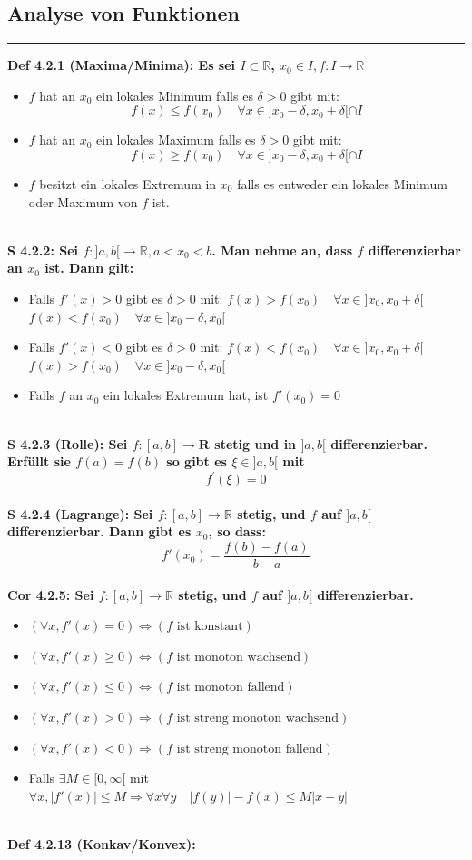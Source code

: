 \documentclass[7pt,landscape, margin = 0.1mm]{article}
\newcommand*{\mysubsection}[1]{\vspace{-2mm}\color{chaptercolor}\subsection{ #1 }
\vspace{-1mm}\hrule\vspace{1.5mm}\color{black}
\vspace{2mm}}
\newcommand{\DEF}[2]{\color{chaptercolor}\bf{Def #1}:\color{black}    \hspace{0.2cm} #2 \\}
\newcommand{\COR}[2]{\color{chaptercolor}\bf{Cor #1}:\color{black}    \hspace{0.2cm} #2 \\}
\newcommand{\SA}[2]{\color{chaptercolor}\bf{S #1}:\color{black}    \hspace{0.2cm} #2 \\}
\begin{document}
\begin{multicols}{4}
\begin{flushleft}
\mysubsection{Analyse von Funktionen}
\DEF{4.2.1 (Maxima/Minima)}{Es sei $I \subset \mathbb{R}$, $x_0 \in I, f:I \longrightarrow \mathbb{R}$
\begin{itemize}


\item[1.] $f$ hat an $x_0$ ein lokales Minimum falls es $\delta >0$ gibt mit:
$$ f(x) \leq f(x_0) \quad \forall x \in ]x_0-\delta,x_0+\delta[\cap I $$
\item[2.] $f$ hat an $x_0$ ein lokales Maximum falls es $\delta >0$ gibt mit:$$ f(x) \geq f(x_0) \quad \forall x \in ]x_0-\delta,x_0+\delta[\cap I $$
\item[3.] $f$ besitzt ein lokales Extremum in $x_0$ falls es entweder ein lokales Minimum oder Maximum von $f$ ist.
\end{itemize}}
\SA{4.2.2}{Sei $f: ]a,b[ \longrightarrow \mathbb{R},a<x_0<b$. Man nehme an, dass $f$ differenzierbar an $x_0$ ist. Dann gilt:
\begin{itemize}
\item[1.] Falls $f'(x)>0$ gibt es $\delta > 0$ mit:
   $f(x)> f(x_0) \quad \forall x \in ]x_0,x_0+\delta[$
$f(x)< f(x_0) \quad \forall x \in ]x_0 - \delta,x_0[$
\item[2.] Falls $f'(x)<0$ gibt es $\delta > 0$ mit:
 $f(x)< f(x_0) \quad \forall x \in ]x_0,x_0+\delta[$
$f(x)> f(x_0) \quad \forall x \in ]x_0 - \delta,x_0[$
\item[3.] Falls $f$ an $x_0$ ein lokales Extremum hat, ist $f'(x_0)=0$
\end{itemize}}
\SA{4.2.3 (Rolle)}{Sei $f:[a, b] \longrightarrow \mathbf{R}$ stetig und in $] a, b[$ differenzierbar. Erfüllt sie $f(a)=f(b)$ so gibt es $\xi \in] a, b[$ mit
$$ f^{\prime}(\xi)=0 $$}
\SA{4.2.4 (Lagrange)}{Sei $f:[a,b] \longrightarrow \mathbb{R}$ stetig, und $f$ auf $]a,b[$ differenzierbar. Dann gibt es $x_0$, so dass:
$$ f'(x_0)= \frac{f(b)-f(a)}{b-a} $$}
\COR{4.2.5}{Sei $f:[a,b] \longrightarrow \mathbb{R}$ stetig, und $f$ auf $]a,b[$ differenzierbar.
\begin{itemize}
\item[1.] $\left( \forall x , f'(x) = 0 \right) \Leftrightarrow \left( f \text{ ist konstant} \right)$
\item[2.] $\left( \forall x , f'(x) \geq 0 \right) \Leftrightarrow \left( f \text{ ist monoton wachsend} \right)$
\item[3.] $\left( \forall x , f'(x) \leq 0 \right) \Leftrightarrow \left( f \text{ ist monoton fallend} \right)$
\item[4.] $\left( \forall x , f'(x) > 0 \right) \Rightarrow \left( f \text{ ist streng monoton wachsend} \right)$
\item[5.] $\left( \forall x , f'(x) < 0 \right) \Rightarrow \left( f \text{ ist streng monoton fallend} \right)$
\item[6.] Falls $\exists M \in [0,\infty[$ mit $\forall x, |f'(x)|\leq M \Rightarrow \forall x \forall y \quad |f(y)|-f(x)\leq M|x-y|$\end{itemize}}
\DEF{4.2.13 (Konkav/Konvex)}{\begin{itemize}


\end{itemize}}
\end{flushleft}
\end{multicols}
\end{document}
